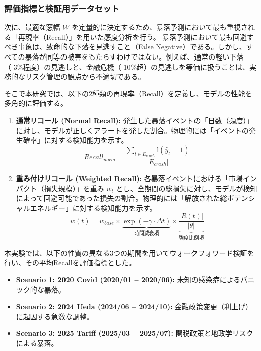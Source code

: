 \documentclass[11pt,a4paper,oneside]{ltjsarticle}
\begin{document}
\subsubsection{評価指標と検証用データセット}
次に、最適な窓幅 $W$ を定量的に決定するため、暴落予測において最も重視される「再現率（Recall）」を用いた感度分析を行う。
暴落予測において最も回避すべき事象は、致命的な下落を見逃すこと（False Negative）である。しかし、すべての暴落が同等の被害をもたらすわけではない。例えば、通常の軽い下落（-3\%程度）の見逃しと、金融危機（-10\%超）の見逃しを等価に扱うことは、実務的なリスク管理の観点から不適切である。

そこで本研究では、以下の2種類の再現率（Recall）を定義し、モデルの性能を多角的に評価する。
\begin{enumerate}
    \item \textbf{通常リコール (Normal Recall):}
    発生した暴落イベントの「日数（頻度）」に対し、モデルが正しくアラートを発した割合。物理的には「イベントの発生確率」に対する検知能力を示す。
    \begin{equation}
      Recall_{norm} = \frac{\sum_{t \in E_{crash}} \mathbb{I}(\hat{y}_t = 1)}{|E_{crash}|}
    \end{equation}

    \item \textbf{重み付けリコール (Weighted Recall):}
    各暴落イベントにおける「市場インパクト（損失規模）」を重み $w_t$ とし、全期間の総損失に対し、モデルが検知によって回避可能であった損失の割合。物理的には「解放された総ポテンシャルエネルギー」に対する検知能力を示す。
    \begin{equation}
    w(t) = w_{base} \times \underbrace{\exp(-\gamma \cdot \Delta t)}_{\text{時間減衰項}} \times \underbrace{\frac{|R(t)|}{|\theta|}}_{\text{強度比例項}}
    \end{equation}
\end{enumerate}

本実験では、以下の性質の異なる3つの期間を用いてウォークフォワード検証を行い、その平均Recallを評価指標とした。

\begin{itemize}
    \item \textbf{Scenario 1: 2020 Covid (2020/01 -- 2020/06):} 未知の感染症によるパニック的な暴落。
    \item \textbf{Scenario 2: 2024 Ueda (2024/06 -- 2024/10):} 金融政策変更（利上げ）に起因する急激な調整。
    \item \textbf{Scenario 3: 2025 Tariff (2025/03 -- 2025/07):} 関税政策と地政学リスクによる暴落。
\end{itemize}
\end{document}
